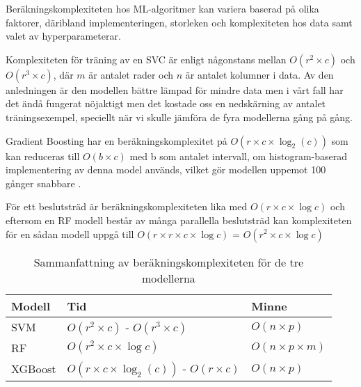 \documentclass[12pt,a4paper]{article}
\begin{document}
Beräkningskomplexiteten hos ML-algoritmer kan variera baserad på olika faktorer, däribland implementeringen, storleken och komplexiteten hos data samt valet av hyperparameterar.

Komplexiteten för träning av en SVC är enligt \cite{Geron} någonstans mellan $O(r^2 \times c)$ och $O(r^3 \times c)$, där $m$ är antalet rader och $n$ är antalet kolumner i data. Av den anledningen är den modellen bättre lämpad för mindre data men i vårt fall har det ändå fungerat nöjaktigt men det kostade oss en nedskärning av antalet träningsexempel, speciellt när vi skulle jämföra de fyra modellerna gång på gång.


Gradient Boosting har en beräkningskomplexitet på $O(r \times c \times \log_{2}(c))$ som kan reduceras till $O(b \times c)$ med b som antalet intervall, om histogram-baserad implementering av denna model används, vilket gör modellen uppemot 100 gånger snabbare \citep{Geron}. 

För ett beslutsträd är beräkningskomplexiteten lika med $O(r \times c \times \log{c})$ \citep{Geron} och eftersom en RF modell består av många parallella beslutsträd kan komplexiteten för en sådan modell uppgå till  $O(r \times r \times c \times \log{c})$ =  $O(r^2 \times c \times \log{c})$



\begin{table}[b]
  \centering
  \footnotesize
  \caption{\footnotesize{Sammanfattning av beräkningskomplexiteten för de tre modellerna}}\label{komplexitetssammanfattning}\vspace{6pt}
  \begin{tabular}{lll}
      \hline 
      Modell & Tid & Minne \\
      \hline 
      SVM & $O(r^2 \times c)$ - $O(r^3 \times c)$ & $O(n \times p)$ \\
      RF & $O(r^2 \times c \times \log{c})$ & $O(n \times p \times m)$ \\
      XGBoost & $O(r \times c \times \log_{2}(c))$ - $O(r \times c)$ & $O(n \times p)$ \\
      \hline 
      \end{tabular}
\end{table}
\end{document}
